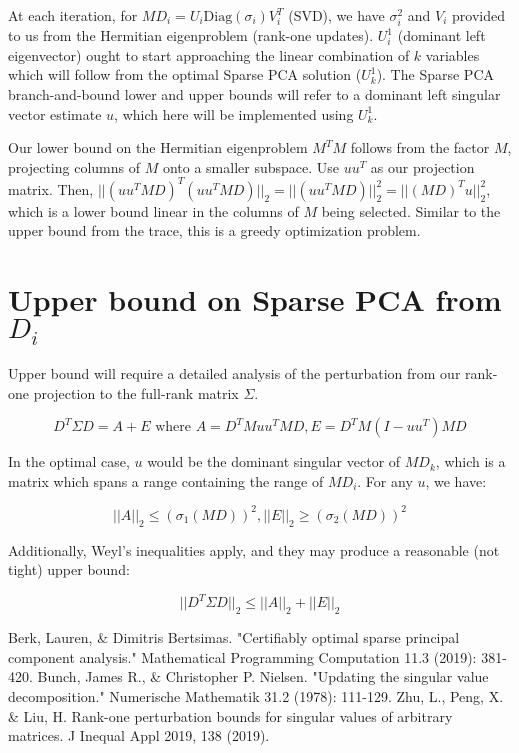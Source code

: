 \documentclass{article}
\begin{document}
At each iteration, for $MD_i = U_i \text{Diag}(\sigma_i) V_i^T$ (SVD), we have $\sigma_i^2$ and $V_i$ provided to us from the Hermitian eigenproblem (rank-one updates). $U_i^1$ (dominant left eigenvector) ought to start approaching the linear combination of $k$ variables which will follow from the optimal Sparse PCA solution ($U_k^1$). The Sparse PCA branch-and-bound lower and upper bounds will refer to a dominant left singular vector estimate $u$, which here will be implemented using $U_k^1$.

Our lower bound on the Hermitian eigenproblem $M^T M$ follows from the factor $M$, projecting columns of $M$ onto a smaller subspace. Use $uu^T$ as our projection matrix. Then, $||(uu^T MD)^T (uu^T MD)||_2 = ||(uu^T MD)||_2^2 = ||(MD)^T u||_2^2$, which is a lower bound linear in the columns of $M$ being selected. Similar to the upper bound from the trace, this is a greedy optimization problem.

\section{Upper bound on Sparse PCA from $D_i$}

Upper bound will require a detailed analysis of the perturbation from our rank-one projection to the full-rank matrix $\Sigma$.

$$
D^T \Sigma D = A + E \text{ where } A = D^T M uu^T MD, E = D^T M (I-uu^T) MD
$$

In the optimal case, $u$ would be the dominant singular vector of $MD_k$, which is a matrix which spans a range containing the range of $MD_i$. For any $u$, we have:

$$
||A||_2 \le \left(\sigma_1(MD)\right)^2,
||E||_2 \ge \left(\sigma_2(MD)\right)^2
$$

Additionally, Weyl's inequalities apply, and they may produce a reasonable (not tight) upper bound:

$$
||D^T \Sigma D||_2 \le ||A||_2 + ||E||_2
$$

\begin{thebibliography}{9}
     Berk, Lauren, \& Dimitris Bertsimas. "Certifiably optimal sparse principal component analysis." Mathematical Programming Computation 11.3 (2019): 381-420.
     Bunch, James R., \& Christopher P. Nielsen. "Updating the singular value decomposition." Numerische Mathematik 31.2 (1978): 111-129.
     Zhu, L., Peng, X. \& Liu, H. Rank-one perturbation bounds for singular values of arbitrary matrices. J Inequal Appl 2019, 138 (2019).
\end{thebibliography}
\end{document}
